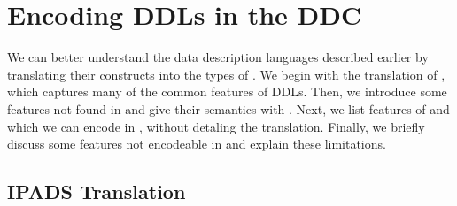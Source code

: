 \section{Encoding DDLs in the DDC}
\label{sec:encodings}

We can better understand the data description languages described
earlier by translating their constructs into the types of \ddc{}. We
begin with the translation of \ipads{}, which captures many of the
common features of DDLs. Then, we introduce some features not found in
\ipads{} and give their semantics with \ddc{}.  Next, we list features
of \datascript{} and \packettypes{} which we can encode in \ddc{},
without detaling the translation. Finally, we briefly discuss some
features not encodeable in \ddc{} and explain these limitations.

\subsection{IPADS Translation}
\label{sec:trans-sl}

